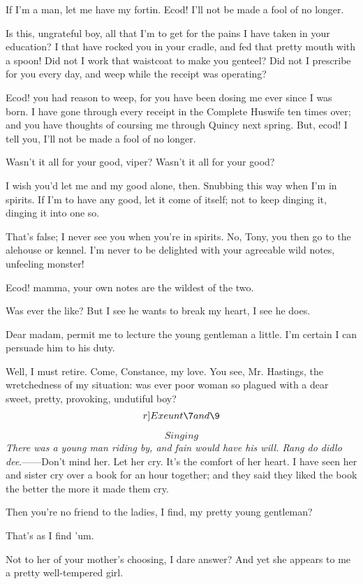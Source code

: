 \documentclass{book}
\begin{document}
\5  If I'm a man, let me have my fortin.  Ecod! I'll not be made a
fool of no longer.

\7  Is this, ungrateful boy, all that I'm to get for the
pains I have taken in your education?  I that have rocked you in your
cradle, and fed that pretty mouth with a spoon!  Did not I work that
waistcoat to make you genteel?  Did not I prescribe for you every day,
and weep while the receipt was operating?

\5  Ecod! you had reason to weep, for you have been dosing me ever
since I was born.  I have gone through every receipt in the Complete
Huswife ten times over; and you have thoughts of coursing me through
Quincy next spring.  But, ecod! I tell you, I'll not be made a fool of
no longer.

\7  Wasn't it all for your good, viper?  Wasn't it all for your good?

\5  I wish you'd let me and my good alone, then.  Snubbing this way
when I'm in spirits.  If I'm to have any good, let it come of itself;
not to keep dinging it, dinging it into one so.

\7  That's false; I never see you when you're in
spirits.  No, Tony, you then go to the alehouse or kennel.  I'm never
to be delighted with your agreeable wild notes, unfeeling monster!

\5  Ecod! mamma, your own notes are the wildest of the two.

\7  Was ever the like?  But I see he wants to break my
heart, I see he does.

\4  Dear madam, permit me to lecture the young gentleman a
little.  I'm certain I can persuade him to his duty.

\7  Well, I must retire.  Come, Constance, my love.  You
see, Mr. Hastings, the wretchedness of my situation: was ever poor
woman so plagued with a dear sweet, pretty, provoking, undutiful
boy? \[r]Exeunt \7 and \9\]

\5  \[Singing\]  \textsl{There was a young man riding by, and fain would
have his will.  Rang do didlo dee}.------Don't mind her.  Let her cry. 
It's the comfort of her heart.  I have seen her and sister cry over a
book for an hour together; and they said they liked the book the better
the more it made them cry.

\4  Then you're no friend to the ladies, I find, my pretty
young gentleman?

\5  That's as I find 'um.

\4  Not to her of your mother's choosing, I dare answer?  And
yet she appears to me a pretty well-tempered girl.
\end{document}
